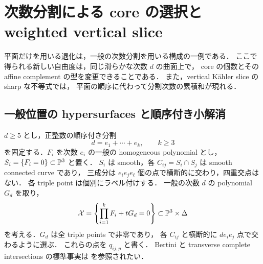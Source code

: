 \section{次数分割による core の選択と weighted vertical slice}
\label{part:section}

平面だけを用いる退化は，一般の次数分割を用いる構成の一例である．
ここで得られる新しい自由度は，同じ滑らかな次数 $d$ の曲面上で，
core の個数とその affine complement の型を変更できることである．
また，vertical Kähler slice の sharp な不等式では，
平面の順序に代わって分割次数の累積和が現れる．

\subsection{一般位置の hypersurfaces と順序付き小解消}

$d\geq5$ とし，正整数の順序付き分割
\[
 d=e_1+\cdots+e_k,\qquad k\geq3
\]
を固定する．$F_i$ を次数 $e_i$ の一般の homogeneous polynomial とし，
$S_i=\{F_i=0\}\subset\mathbb P^3$ と置く．
$S_i$ は smooth，各 $C_{ij}=S_i\cap S_j$ は smooth connected curve であり，
三成分は $e_i e_j e_\ell$ 個の点で横断的に交わり，四重交点はない．
各 triple point は個別にラベル付けする．
一般の次数 $d$ の polynomial $G_d$ を取り，
\begin{equation}\label{part:family}
 \mathcal X=\left\{\prod_{i=1}^kF_i+tG_d=0\right\}
     \subset\mathbb P^3\times\Delta
\end{equation}
を考える．$G_d$ は全 triple points で非零であり，
各 $C_{ij}$ と横断的に $d e_i e_j$ 点で交わるように選ぶ．
これらの点を $q_{ij,p}$ と書く．
Bertini と transverse complete intersections の標準事実は
\cite[Chapters II--III]{Hartshorne}を参照されたい．

